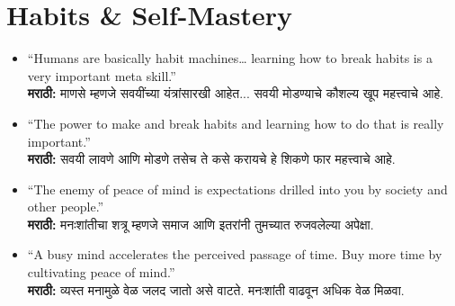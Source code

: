 \section*{Habits \& Self-Mastery}
\begin{itemize}
    \item ``Humans are basically habit machines… learning how to break habits is a very important meta skill.'' \\
    \textbf{मराठी:} माणसे म्हणजे सवयींच्या यंत्रांसारखी आहेत... सवयी मोडण्याचे कौशल्य खूप महत्त्वाचे आहे.

    \item ``The power to make and break habits and learning how to do that is really important.'' \\
    \textbf{मराठी:} सवयी लावणे आणि मोडणे तसेच ते कसे करायचे हे शिकणे फार महत्त्वाचे आहे.

    \item ``The enemy of peace of mind is expectations drilled into you by society and other people.'' \\
    \textbf{मराठी:} मनःशांतीचा शत्रू म्हणजे समाज आणि इतरांनी तुमच्यात रुजवलेल्या अपेक्षा.

    \item ``A busy mind accelerates the perceived passage of time. Buy more time by cultivating peace of mind.'' \\
    \textbf{मराठी:} व्यस्त मनामुळे वेळ जलद जातो असे वाटते. मनःशांती वाढवून अधिक वेळ मिळवा.
\end{itemize}

